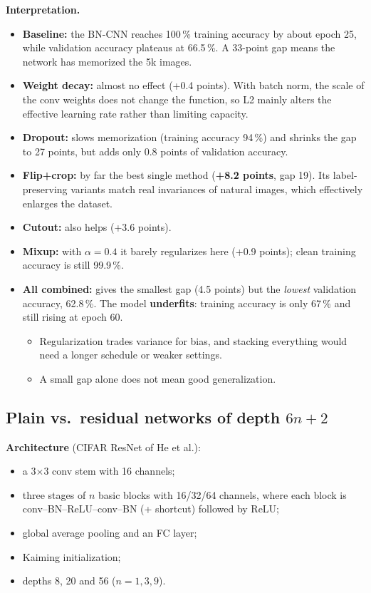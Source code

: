 \documentclass[11pt,a4paper]{article}
\begin{document}
\textbf{Interpretation.}
\begin{itemize}
  \item \textbf{Baseline:} the BN-CNN reaches 100\,\% training accuracy by about epoch 25, while validation accuracy plateaus at 66.5\,\%. A 33-point gap means the network has memorized the 5k images.
  \item \textbf{Weight decay:} almost no effect (+0.4 points). With batch norm, the scale of the conv weights does not change the function, so L2 mainly alters the effective learning rate rather than limiting capacity.
  \item \textbf{Dropout:} slows memorization (training accuracy 94\,\%) and shrinks the gap to 27 points, but adds only 0.8 points of validation accuracy.
  \item \textbf{Flip+crop:} by far the best single method (\textbf{+8.2 points}, gap 19). Its label-preserving variants match real invariances of natural images, which effectively enlarges the dataset.
  \item \textbf{Cutout:} also helps (+3.6 points).
  \item \textbf{Mixup:} with $\alpha=0.4$ it barely regularizes here (+0.9 points); clean training accuracy is still 99.9\,\%.
  \item \textbf{All combined:} gives the smallest gap (4.5 points) but the \emph{lowest} validation accuracy, 62.8\,\%. The model \textbf{underfits}: training accuracy is only 67\,\% and still rising at epoch 60.
  \begin{itemize}
    \item Regularization trades variance for bias, and stacking everything would need a longer schedule or weaker settings.
    \item A small gap alone does not mean good generalization.
  \end{itemize}
\end{itemize}

\subsection{Plain vs.\ residual networks of depth $6n+2$}

\textbf{Architecture} (CIFAR ResNet of He et al.):
\begin{itemize}
  \item a 3$\times$3 conv stem with 16 channels;
  \item three stages of $n$ basic blocks with 16/32/64 channels, where each block is conv--BN--ReLU--conv--BN (+ shortcut) followed by ReLU;
  \item global average pooling and an FC layer;
  \item Kaiming initialization;
  \item depths 8, 20 and 56 ($n=1,3,9$).
\end{itemize}
\end{document}
